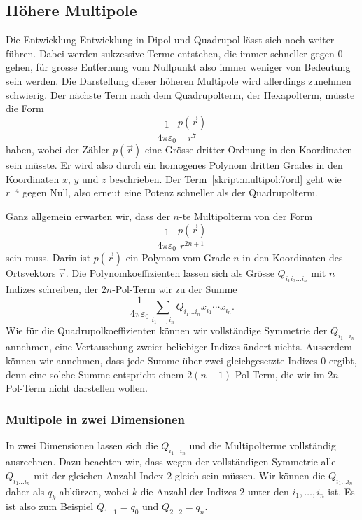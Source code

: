 \subsection{Höhere Multipole}
Die Entwicklung Entwicklung in Dipol und Quadrupol lässt sich noch
weiter führen.
Dabei werden sukzessive Terme entstehen, die immer schneller gegen $0$
gehen, für grosse Entfernung vom Nullpunkt also immer weniger von
Bedeutung sein werden.
Die Darstellung dieser höheren Multipole wird allerdings zunehmen
schwierig. 
Der nächste Term nach dem Quadrupolterm, der Hexapolterm, müsste die Form
\begin{equation}
\frac1{4\pi\varepsilon_0}\frac{p(\vec r)}{r^7}
\label{skript:multipol:7ord}
\end{equation}
haben, wobei der Zähler $p(\vec r)$ eine Grösse dritter Ordnung in
den Koordinaten sein müsste.
Er wird also durch ein homogenes Polynom dritten Grades in den Koordinaten
$x$, $y$ und $z$ beschrieben.
Der Term~\eqref{skript:multipol:7ord} geht wie $r^{-4}$ gegen Null,
also erneut eine Potenz schneller als der Quadrupolterm.

Ganz allgemein erwarten wir, dass der $n$-te Multipolterm von der Form
\[
\frac{1}{4\pi\varepsilon_0} \frac{p(\vec r)}{r^{2n+1}}
\]
sein muss.
Darin ist $p(\vec r)$ ein Polynom vom Grade $n$ in den Koordinaten
des Ortsvektors $\vec r$.
Die Polynomkoeffizienten lassen sich als Grösse $Q_{i_1i_2\dots i_n}$
mit $n$ Indizes schreiben,
der $2n$-Pol-Term wir zu der Summe
\begin{equation}
\frac{1}{4\pi\varepsilon_0}
\sum_{i_1,\dots,i_n} Q_{i_1\dots i_n} x_{i_1}\cdots x_{i_n}.
\label{skript:multipol:npolterm}
\end{equation}
Wie für die Quadrupolkoeffizienten können wir vollständige Symmetrie
der $Q_{i_1\dots i_n}$ annehmen, eine Vertauschung zweier beliebiger
Indizes ändert nichts.
Ausserdem können wir annehmen, dass jede Summe über zwei gleichgesetzte
Indizes $0$ ergibt, denn eine solche Summe entspricht einem $2(n-1)$-Pol-Term,
die wir im $2n$-Pol-Term nicht darstellen wollen.

\subsubsection{Multipole in zwei Dimensionen}
In zwei Dimensionen lassen sich die $Q_{i_1\dots i_n}$ und die Multipolterme
vollständig ausrechnen.
Dazu beachten wir, dass wegen der vollständigen Symmetrie alle 
$Q_{i_1\dots i_n}$ mit der gleichen Anzahl Index $2$ gleich sein
müssen.
Wir können die $Q_{i_1\dots i_n}$ daher als $q_k$ abkürzen, wobei $k$ die
Anzahl der Indizes $2$ unter den $i_1,\dots,i_n$ ist.
Es ist also zum Beispiel
$Q_{1\dots 1}=q_0$ und $Q_{2\dots 2}=q_n$.

